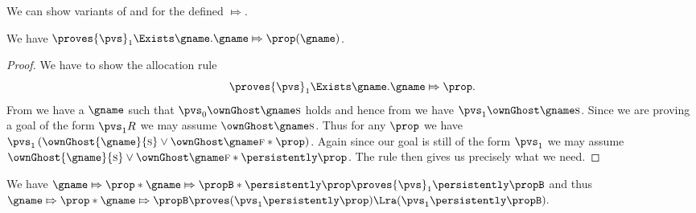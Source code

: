 We can show variants of  and  for the defined $\Mapsto$.
\begin{lem}
  \label{lem:counterexample-invariants-saved-prop-alloc}
We have
  \(\proves {\pvs}_1 \Exists \gname. \gname \Mapsto \prop(\gname)\).
\end{lem}
\begin{proof}
  We have to show the allocation rule \[\proves {\pvs}_1 \Exists \gname. \gname \Mapsto \prop.\]
    From  we have a $\gname$ such that ${\pvs}_0 \ownGhost \gname \starttoken$ holds and hence from  we have ${\pvs}_1\ownGhost\gname \starttoken$.
    Since we are proving a goal of the form ${\pvs}_1 R$ we may assume $\ownGhost \gname \starttoken$.
    Thus for any $\prop$ we have ${\pvs}_1\left(\ownGhost{\gname}{\starttoken} \lor \ownGhost \gname \finishtoken * \prop\right)$.
    Again since our goal is still of the form ${\pvs}_1$ we may assume $\ownGhost{\gname}{\starttoken} \lor \ownGhost \gname \finishtoken * \persistently \prop$.
    The rule  then gives us precisely what we need.
 \end{proof}

%
\begin{lem}
\label{lem:counterexample-invariants-saved-prop-agree}
We have
  \(
  \gname \Mapsto \prop * \gname \Mapsto \propB * \persistently \prop \proves {\pvs}_1 \persistently \propB
  \)
and thus
  \(
  \gname \Mapsto \prop * \gname \Mapsto \propB \proves ({\pvs}_1 \persistently \prop) \Lra ({\pvs}_1 \persistently \propB).
  \)
\end{lem}

